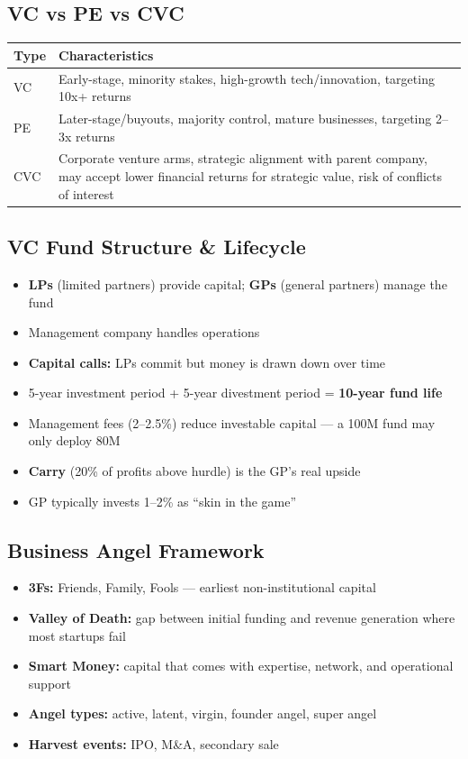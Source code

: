 \documentclass[a4paper,11pt]{article}
\begin{document}
\subsection{VC vs PE vs CVC}

\begin{tabular}{@{}p{}p{}@{}}
\toprule
\textbf{Type} & \textbf{Characteristics} \\
\midrule
VC & Early-stage, minority stakes, high-growth tech/innovation, targeting 10x+ returns \\
PE & Later-stage/buyouts, majority control, mature businesses, targeting 2--3x returns \\
CVC & Corporate venture arms, strategic alignment with parent company, may accept lower financial returns for strategic value, risk of conflicts of interest \\
\bottomrule
\end{tabular}

\subsection{VC Fund Structure \& Lifecycle}

\begin{itemize}
\item \textbf{LPs} (limited partners) provide capital; \textbf{GPs} (general partners) manage the fund
\item Management company handles operations
\item \textbf{Capital calls:} LPs commit but money is drawn down over time
\item 5-year investment period + 5-year divestment period = \textbf{10-year fund life}
\item Management fees (2--2.5\%) reduce investable capital --- a \texteuro100M fund may only deploy \texteuro80M
\item \textbf{Carry} (20\% of profits above hurdle) is the GP's real upside
\item GP typically invests 1--2\% as ``skin in the game''
\end{itemize}

\subsection{Business Angel Framework}

\begin{itemize}
\item \textbf{3Fs:} Friends, Family, Fools --- earliest non-institutional capital
\item \textbf{Valley of Death:} gap between initial funding and revenue generation where most startups fail
\item \textbf{Smart Money:} capital that comes with expertise, network, and operational support
\item \textbf{Angel types:} active, latent, virgin, founder angel, super angel
\item \textbf{Harvest events:} IPO, M\&A, secondary sale
\end{itemize}
\end{document}
